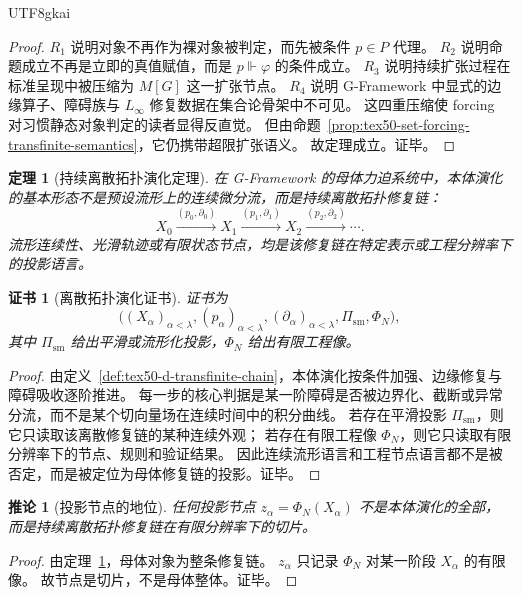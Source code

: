 \documentclass[12pt]{article}
\newtheorem{theorem}{定理}[section]
\newtheorem{corollary}{推论}[section]
\newtheorem{Certificate}{证书}[section]
\newcommand{\GFramework}{\textsf{G-Framework}}
\newcommand{\Linfty}{\ensuremath{L_\infty}}
\begin{document}
\begin{CJK*}{UTF8}{gkai}
\begin{proof}
$R_1$ 说明对象不再作为裸对象被判定，而先被条件 $p\in P$ 代理。
$R_2$ 说明命题成立不再是立即的真值赋值，而是 $p\Vdash\varphi$ 的条件成立。
$R_3$ 说明持续扩张过程在标准呈现中被压缩为 $M[G]$ 这一扩张节点。
$R_4$ 说明 \GFramework{} 中显式的边缘算子、障碍族与 \Linfty{} 修复数据在集合论骨架中不可见。
这四重压缩使 forcing 对习惯静态对象判定的读者显得反直觉。
但由命题~\ref{prop:tex50-set-forcing-transfinite-semantics}，它仍携带超限扩张语义。
故定理成立。证毕。
\end{proof}

\begin{theorem}[持续离散拓扑演化定理]
\label{thm:tex50-discrete-topological-evolution}
在 \GFramework{} 的母体力迫系统中，本体演化的基本形态不是预设流形上的连续微分流，而是持续离散拓扑修复链：
\[
  X_0
  \xrightarrow{(p_0,\partial_0)}
  X_1
  \xrightarrow{(p_1,\partial_1)}
  X_2
  \xrightarrow{(p_2,\partial_2)}
  \cdots .
\]
流形连续性、光滑轨迹或有限状态节点，均是该修复链在特定表示或工程分辨率下的投影语言。
\end{theorem}

\begin{Certificate}[离散拓扑演化证书]
证书为
\[
  \bigl((X_\alpha)_{\alpha<\lambda},(p_\alpha)_{\alpha<\lambda},
  (\partial_\alpha)_{\alpha<\lambda},\Pi_{\mathrm{sm}},\Phi_N\bigr),
\]
其中 $\Pi_{\mathrm{sm}}$ 给出平滑或流形化投影，$\Phi_N$ 给出有限工程像。
\end{Certificate}

\begin{proof}
由定义~\ref{def:tex50-d-transfinite-chain}，本体演化按条件加强、边缘修复与障碍吸收逐阶推进。
每一步的核心判据是某一阶障碍是否被边界化、截断或异常分流，而不是某个切向量场在连续时间中的积分曲线。
若存在平滑投影 $\Pi_{\mathrm{sm}}$，则它只读取该离散修复链的某种连续外观；
若存在有限工程像 $\Phi_N$，则它只读取有限分辨率下的节点、规则和验证结果。
因此连续流形语言和工程节点语言都不是被否定，而是被定位为母体修复链的投影。证毕。
\end{proof}

\begin{corollary}[投影节点的地位]
\label{cor:tex50-projection-node-status}
任何投影节点 $z_\alpha=\Phi_N(X_\alpha)$ 不是本体演化的全部，而是持续离散拓扑修复链在有限分辨率下的切片。
\end{corollary}

\begin{proof}
由定理~\ref{thm:tex50-discrete-topological-evolution}，母体对象为整条修复链。
$z_\alpha$ 只记录 $\Phi_N$ 对某一阶段 $X_\alpha$ 的有限像。
故节点是切片，不是母体整体。证毕。
\end{proof}


\end{CJK*}
\end{document}
